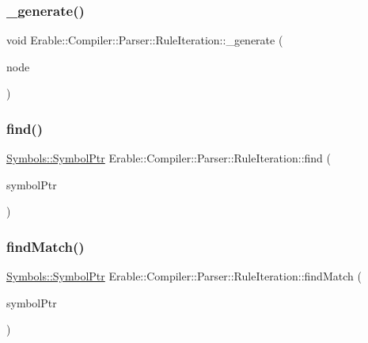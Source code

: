 \subsubsection{\texorpdfstring{\_generate()}{\_generate()}}
{\footnotesize\ttfamily void Erable\+::\+Compiler\+::\+Parser\+::\+Rule\+Iteration\+::\+\_\+generate (\begin{DoxyParamCaption}\item[{\mbox{\hyperlink{struct_erable_1_1_compiler_1_1_parser_1_1_iteration_node}{Iteration\+Node}} $\ast$}]{node }\end{DoxyParamCaption})\hspace{0.3cm}{\ttfamily [protected]}}

\mbox{\label{class_erable_1_1_compiler_1_1_parser_1_1_rule_iteration_ad3a2635baa4caa8648a35ee2ed25c34f}} 
\subsubsection{\texorpdfstring{find()}{find()}}
{\footnotesize\ttfamily \mbox{\hyperlink{namespace_erable_1_1_compiler_1_1_symbols_a8f0bc762f448ea4d84e8713ab3e140b9}{Symbols\+::\+Symbol\+Ptr}} Erable\+::\+Compiler\+::\+Parser\+::\+Rule\+Iteration\+::find (\begin{DoxyParamCaption}\item[{\mbox{\hyperlink{namespace_erable_1_1_compiler_1_1_symbols_a8f0bc762f448ea4d84e8713ab3e140b9}{Symbols\+::\+Symbol\+Ptr}}}]{symbol\+Ptr }\end{DoxyParamCaption})}

\mbox{\label{class_erable_1_1_compiler_1_1_parser_1_1_rule_iteration_a086a865a1b222a17e251c149987dff89}} 
\subsubsection{\texorpdfstring{findMatch()}{findMatch()}}
{\footnotesize\ttfamily \mbox{\hyperlink{namespace_erable_1_1_compiler_1_1_symbols_a8f0bc762f448ea4d84e8713ab3e140b9}{Symbols\+::\+Symbol\+Ptr}} Erable\+::\+Compiler\+::\+Parser\+::\+Rule\+Iteration\+::find\+Match (\begin{DoxyParamCaption}\item[{\mbox{\hyperlink{namespace_erable_1_1_compiler_1_1_symbols_a8f0bc762f448ea4d84e8713ab3e140b9}{Symbols\+::\+Symbol\+Ptr}}}]{symbol\+Ptr }\end{DoxyParamCaption})}

